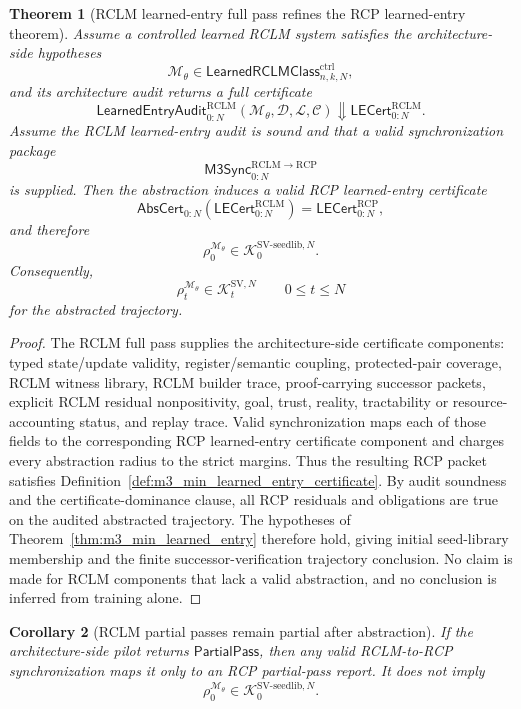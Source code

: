 \documentclass[11pt]{article}
\newtheorem{theorem}{Theorem}[section]
\newtheorem{corollary}[theorem]{Corollary}
\newcommand{\1}{\mathbf{1}}
\newcommand{\RCP}{\mathrm{RCP}}
\providecommand{\RCLM}{\mathrm{RCLM}}
\providecommand{\Kcal}{\mathcal{K}}
\begin{document}
\begin{theorem}[RCLM learned-entry full pass refines the RCP learned-entry theorem]
\label{thm:m3_sync_rclm_full_pass_refines_rcp}
Assume a controlled learned RCLM system satisfies the architecture-side hypotheses
\[
\mathcal M_\theta\in\mathsf{LearnedRCLMClass}_{n,k,N}^{\mathrm{ctrl}},
\]
and its architecture audit returns a full certificate
\[
\mathsf{LearnedEntryAudit}_{0:N}^{\RCLM}
(\mathcal M_\theta,\mathcal D,\mathcal L,\mathcal C)
\Downarrow
\mathsf{LECert}_{0:N}^{\RCLM}.
\]
Assume the RCLM learned-entry audit is sound and that a valid synchronization package
\[
\mathsf{M3Sync}_{0:N}^{\RCLM\to\RCP}
\]
is supplied.  Then the abstraction induces a valid RCP learned-entry certificate
\[
\mathsf{AbsCert}_{0:N}(\mathsf{LECert}_{0:N}^{\RCLM})
=
\mathsf{LECert}_{0:N}^{\RCP},
\]
and therefore
\[
\rho_0^{\mathcal M_\theta}
\in
\Kcal_0^{\mathrm{SV\mbox{-}seedlib},N}.
\]
Consequently,
\[
\rho_t^{\mathcal M_\theta}
\in
\Kcal_t^{\mathrm{SV},N}
\qquad 0\le t\le N
\]
for the abstracted trajectory.
\end{theorem}

\begin{proof}
The RCLM full pass supplies the architecture-side certificate components: typed state/update validity, register/semantic coupling, protected-pair coverage, RCLM witness library, RCLM builder trace, proof-carrying successor packets, explicit RCLM residual nonpositivity, goal, trust, reality, tractability or resource-accounting status, and replay trace.  Valid synchronization maps each of those fields to the corresponding RCP learned-entry certificate component and charges every abstraction radius to the strict margins.  Thus the resulting RCP packet satisfies Definition~\ref{def:m3_min_learned_entry_certificate}.  By audit soundness and the certificate-dominance clause, all RCP residuals and obligations are true on the audited abstracted trajectory.  The hypotheses of Theorem~\ref{thm:m3_min_learned_entry} therefore hold, giving initial seed-library membership and the finite successor-verification trajectory conclusion.  No claim is made for RCLM components that lack a valid abstraction, and no conclusion is inferred from training alone.
\end{proof}

\begin{corollary}[RCLM partial passes remain partial after abstraction]
\label{cor:m3_sync_rclm_partial_remains_partial}
If the architecture-side pilot returns \(\mathsf{PartialPass}\), then any valid RCLM-to-RCP synchronization maps it only to an RCP partial-pass report.  It does not imply
\[
\rho_0^{\mathcal M_\theta}\in\Kcal_0^{\mathrm{SV\mbox{-}seedlib},N}.
\]
\end{corollary}
\end{document}
